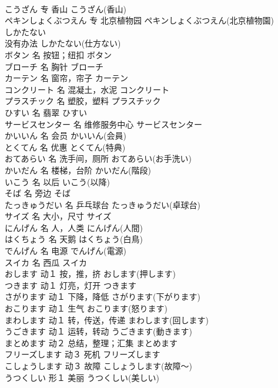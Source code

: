 \documentclass[8pt]{extreport}
\begin{document}
\begin{CJK}{UTF8}{min}
\\	こうざん	专	香山	こうざん(香山)	
\\	ペキンしょくぶつえん	专	北京植物园	ペキンしょくぶつえん(北京植物園)	
\\	しかたない	
\\	没有办法	しかたない(仕方ない)	
\\	ボタン	名	按钮；纽扣	ボタン	
\\	ブローチ	名	胸针	ブローチ	
\\	カーテン	名	窗帘，帘子	カーテン	
\\	コンクリート	名	混凝土，水泥	コンクリート	
\\	プラスチック	名	塑胶，塑料	プラスチック	
\\	ひすい	名	翡翠	ひすい	
\\	サービスセンター	名	维修服务中心	サービスセンター	
\\	かいいん	名	会员	かいいん(会員)	
\\	とくてん	名	优惠	とくてん(特典)	
\\	おてあらい	名	洗手间，厕所	おてあらい(お手洗い)	
\\	かいだん	名	楼梯，台阶	かいだん(階段)	
\\	いこう	名	以后	いこう(以降)	
\\	そば	名	旁边	そば	
\\	たっきゅうだい	名	乒乓球台	たっきゅうだい(卓球台)	
\\	サイズ	名	大小，尺寸	サイズ	
\\	にんげん	名	人，人类	にんげん(人間)	
\\	はくちょう	名	天鹅	はくちょう(白鳥)	
\\	でんげん	名	电源	でんげん(電源)	
\\	スイカ	名	西瓜	スイカ	
\\	おします	动１	按，推，挤	おします(押します)	
\\	つきます	动１	灯亮，灯开	つきます	
\\	さがります	动１	下降，降低	さがります(下がります)	
\\	おこります	动１	生气	おこります(怒ります)	
\\	まわします	动１	转，传送，传递	まわします(回します)	
\\	うごきます	动１	运转，转动	うごきます(動きます)	
\\	まとめます	动２	总结，整理；汇集	まとめます	
\\	フリーズします	动３	死机	フリーズします	
\\	こしょうします	动３	故障	こしょうします(故障～)	
\\	うつくしい	形１	美丽	うつくしい(美しい)	

\end{CJK}
\end{document}
